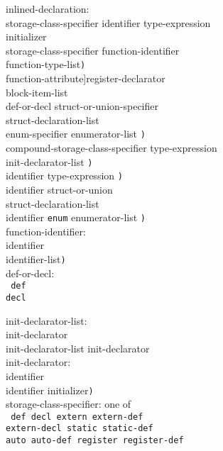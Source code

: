 \documentclass[a4j,twocolumn]{article}
\begin{document}
\noindent
inlined-declaration: \\
\quad {\tt (}storage-class-specifier identifier type-expression \\
\quad \quad initializer\opt {\tt )} \\
\quad {\tt (}storage-class-specifier function-identifier \\
\quad {} function-type-list{\tt )}\\
\quad \quad {\rm [}{\tt :attr} function-attribute{\rm ]}\opt register-declarator\opt \\
\quad \quad block-item-list\opt {\tt )} \\ 
\quad {\tt (}def-or-decl struct-or-union-specifier \\
\quad \quad struct-declaration-list\opt {\tt )} \\
 enum-specifier enumerator-list {\tt )} \\
\quad {\tt (}compound-storage-class-specifier type-expression \\
\quad \quad init-declarator-list {\tt )} \\
 identifier type-expression {\tt )} \\
 identifier struct-or-union \\
\quad \quad struct-declaration-list\opt {\tt )} \\
 identifier {\tt enum} enumerator-list {\tt )} \\

\noindent
function-identifier: \\
\quad identifier \\
\quad {\tt (}identifier-list{\tt )} \\

\noindent
def-or-decl: \\ \tt
\quad def \\
\quad decl \\ \it

\noindent
init-declarator-list: \\
\quad init-declarator \\
\quad init-declarator-list init-declarator \\ 

\noindent
init-declarator: \\
\quad identifier \\
\quad {\tt (}identifier initializer{\tt )} \\ 

\noindent
storage-class-specifier: {\rm one of} \\  \tt
\quad def decl extern extern-def \\
\quad extern-decl static static-def \\
\quad auto auto-def register register-def \\ \it
\end{document}
